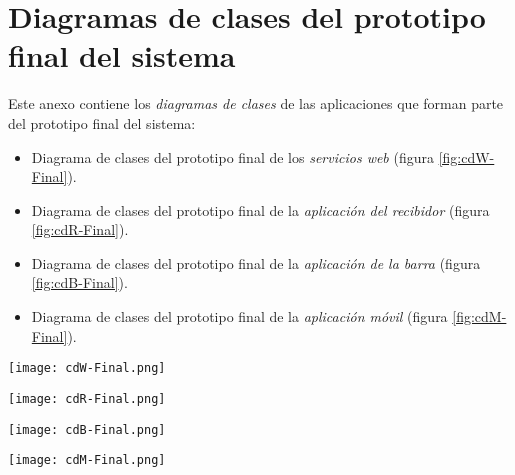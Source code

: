 \chapter{Diagramas de clases del prototipo final del sistema}
\label{chap:classDiagrams}

Este anexo contiene los \emph{diagramas de clases} de las aplicaciones que
forman parte del prototipo final del sistema:
\begin{itemize}
\item Diagrama de clases del prototipo final de los \emph{servicios web}
(figura \ref{fig:cdW-Final}).
\item Diagrama de clases del prototipo final de la \emph{aplicación del 
recibidor} (figura \ref{fig:cdR-Final}).
\item Diagrama de clases del prototipo final de la \emph{aplicación de la
barra} (figura \ref{fig:cdB-Final}).
\item Diagrama de clases del prototipo final de la \emph{aplicación móvil}
(figura \ref{fig:cdM-Final}).
\end{itemize}

  \begin{sidewaysfigure}[h]
    \begin{center}
      \texttt{[image: cdW-Final.png]}
      \caption{Diagrama de clases del prototipo final de los servicios web.}
      \label{fig:cdW-Final}
    \end{center}
  \end{sidewaysfigure}

  \begin{sidewaysfigure}[h]
    \begin{center}
      \texttt{[image: cdR-Final.png]}
      \caption{Diagrama de clases del prototipo final de la aplicación del
      recibidor.}
      \label{fig:cdR-Final}
    \end{center}
  \end{sidewaysfigure}

  \begin{sidewaysfigure}[h]
    \begin{center}
      \texttt{[image: cdB-Final.png]}
      \caption{Diagrama de clases del prototipo final de la aplicación de la
      barra.}
      \label{fig:cdB-Final}
    \end{center}
  \end{sidewaysfigure}

  \begin{sidewaysfigure}[h]
    \begin{center}
      \texttt{[image: cdM-Final.png]}
      \caption{Diagrama de clases del prototipo final de la aplicación móvil.}
      \label{fig:cdM-Final}
    \end{center}
  \end{sidewaysfigure}
